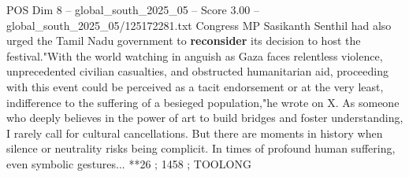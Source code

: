 \begin{textsample}{POS Dim 8 – global\_south\_2025\_05 – Score 3.00 – global\_south\_2025\_05/125172281.txt}
Congress MP Sasikanth Senthil had also urged the Tamil Nadu government to \textbf{reconsider} its decision to host the festival."With the world watching in anguish as Gaza faces relentless violence, unprecedented civilian casualties, and obstructed humanitarian aid, proceeding with this event could be perceived as a tacit endorsement or at the very least, indifference to the suffering of a besieged population,"he wrote on X.
As someone who deeply believes in the power of art to build bridges and foster understanding, I rarely call for cultural cancellations.
But there are moments in history when silence or neutrality risks being complicit.
In times of profound human suffering, even symbolic gestures... **26 ; 1458 ; TOOLONG

\end{textsample}
